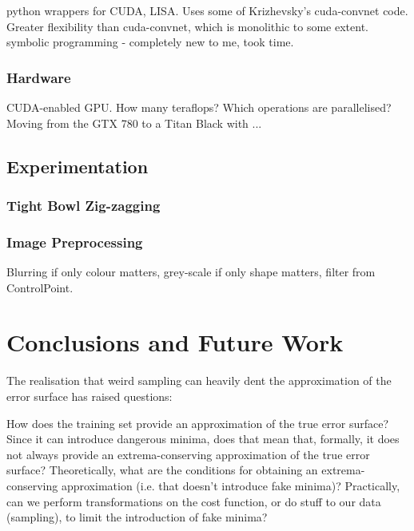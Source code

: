 \documentclass[a4paper,11pt]{article}
\begin{document}
python wrappers for CUDA, LISA. Uses some of Krizhevsky's cuda-convnet code. \\

Greater flexibility than cuda-convnet, which is monolithic to some extent. \\

symbolic programming - completely new to me, took time. \\


\subsubsection{Hardware}

CUDA-enabled GPU. How many teraflops? Which operations are parallelised? 
Moving from the GTX 780 to a Titan Black with ... \\

\subsection{Experimentation}

\subsubsection{Tight Bowl Zig-zagging}

\subsubsection{Image Preprocessing}

Blurring if only colour matters, grey-scale if only shape matters, filter from ControlPoint. \\


\clearpage
\section{Conclusions and Future Work}

The realisation that weird sampling can heavily dent the approximation of the error surface has raised questions:

How does the training set provide an approximation of the true error surface? Since it can introduce dangerous minima, does that mean that, formally, it does not always provide an extrema-conserving approximation of the true error surface? Theoretically, what are the conditions for obtaining an extrema-conserving approximation (i.e. that doesn't introduce fake minima)? Practically, can we perform transformations on the cost function, or do stuff to our data (sampling), to limit the introduction of fake minima?  \\
\end{document}
